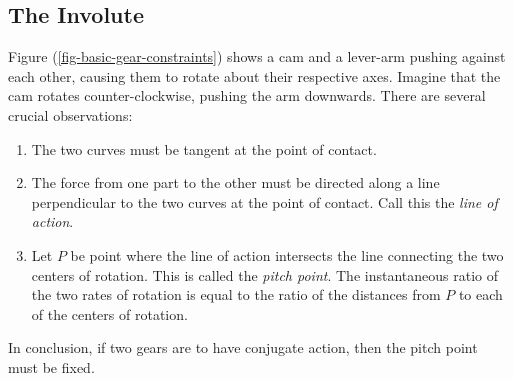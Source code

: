 \documentclass[10pt]{article}
\begin{document}
\subsection{The Involute}
  
Figure (\ref{fig-basic-gear-constraints}) shows a cam and a lever-arm
pushing against each other, causing them to rotate about their
respective axes. Imagine that the cam rotates counter-clockwise,
pushing the arm downwards. There are several crucial observations:
\begin{enumerate}[itemsep=-1pt]
\item The two curves must be tangent at the point of contact.
\item The force from one part to the other must be directed along a
  line perpendicular to the two curves at the point of contact. Call
  this the \emph{line of action}.
\item Let $P$ be point where the line of action intersects the line
  connecting the two centers of rotation. This is called the
  \emph{pitch point}. The instantaneous ratio of
  the two rates of rotation is equal to the ratio of the distances
  from $P$ to each of the centers of rotation.
\end{enumerate}
In conclusion, if two gears are to have conjugate action, then the
pitch point must be fixed.
\end{document}
